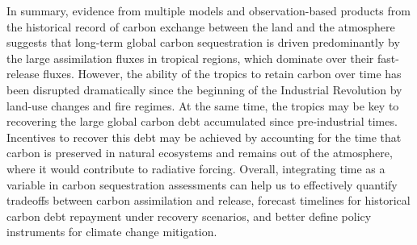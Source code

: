 \documentclass[9pt,twocolumn,twoside]{pnas-new}
\begin{document}
In summary, evidence from multiple models and observation-based products from the historical record of carbon exchange between the land and the atmosphere suggests that long-term global carbon sequestration is driven predominantly by the large assimilation fluxes in tropical regions, which dominate over their fast-release fluxes. However, the ability of the tropics to retain carbon over time has been disrupted dramatically since the beginning of the Industrial Revolution by land-use changes and fire regimes. At the same time, the tropics may be key to recovering the large global carbon debt accumulated since pre-industrial times. Incentives to recover this debt may be achieved by accounting for the time that carbon is preserved in natural ecosystems and remains out of the atmosphere, where it would contribute to radiative forcing. Overall, integrating time as a variable in carbon sequestration assessments can help us to effectively quantify tradeoffs between carbon assimilation and release, forecast timelines for historical carbon debt repayment under recovery scenarios, and better define policy instruments for climate change mitigation.


\end{document}
